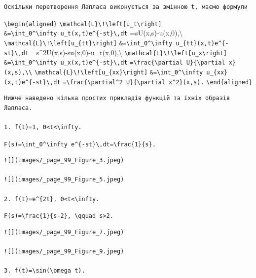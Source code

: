 \documentclass[
  ukrainian,
]{article}
\begin{document}
\begin{verbatim}
Оскільки перетворення Лапласа виконується за змінною t, маємо формули
\end{verbatim}

\texttt{\textbackslash{}begin\{aligned\}}
\texttt{\textbackslash{}mathcal\{L\}\textbackslash{}!\textbackslash{}left{[}u\_t\textbackslash{}right{]}}
\texttt{\&=\textbackslash{}int\_0\^{}\textbackslash{}infty\ u\_t(x,t)e\^{}\{-st\}\textbackslash{},dt}
=sU(x,s)-u(x,0),\textbackslash{}
\texttt{\textbackslash{}mathcal\{L\}\textbackslash{}!\textbackslash{}left{[}u\_\{tt\}\textbackslash{}right{]}}
\texttt{\&=\textbackslash{}int\_0\^{}\textbackslash{}infty\ u\_\{tt\}(x,t)e\^{}\{-st\}\textbackslash{},dt}
=s\^{}2U(x,s)-su(x,0)-u\_t(x,0),\textbackslash{}
\texttt{\textbackslash{}mathcal\{L\}\textbackslash{}!\textbackslash{}left{[}u\_x\textbackslash{}right{]}}
\texttt{\&=\textbackslash{}int\_0\^{}\textbackslash{}infty\ u\_x(x,t)e\^{}\{-st\}\textbackslash{},dt}
\texttt{=\textbackslash{}frac\{\textbackslash{}partial\ U\}\{\textbackslash{}partial\ x\}(x,s),\textbackslash{}\textbackslash{}}
\texttt{\textbackslash{}mathcal\{L\}\textbackslash{}!\textbackslash{}left{[}u\_\{xx\}\textbackslash{}right{]}}
\texttt{\&=\textbackslash{}int\_0\^{}\textbackslash{}infty\ u\_\{xx\}(x,t)e\^{}\{-st\}\textbackslash{},dt}
\texttt{=\textbackslash{}frac\{\textbackslash{}partial\^{}2\ U\}\{\textbackslash{}partial\ x\^{}2\}(x,s).}
\texttt{\textbackslash{}end\{aligned\}}

\begin{verbatim}
Нижче наведено кілька простих прикладів функцій та їхніх образів Лапласа.

1. f(t)=1, 0<t<\infty.
\end{verbatim}

\texttt{F(s)=\textbackslash{}int\_0\^{}\textbackslash{}infty\ e\^{}\{-st\}\textbackslash{},dt=\textbackslash{}frac\{1\}\{s\}.}

\begin{verbatim}
![](images/_page_99_Figure_3.jpeg)

![](images/_page_99_Figure_5.jpeg)

2. f(t)=e^{2t}, 0<t<\infty.
\end{verbatim}

\texttt{F(s)=\textbackslash{}frac\{1\}\{s-2\},\ \textbackslash{}qquad\ s\textgreater{}2.}

\begin{verbatim}
![](images/_page_99_Figure_7.jpeg)

![](images/_page_99_Figure_9.jpeg)

3. f(t)=\sin(\omega t).
\end{verbatim}
\end{document}
